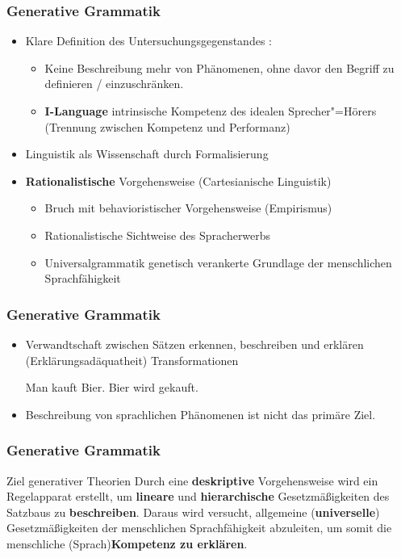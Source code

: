 \begin{frame}
\frametitle{Generative Grammatik}

\begin{itemize}
	\item Klare Definition des Untersuchungsgegenstandes :
	\begin{itemize}
		\item Keine Beschreibung mehr von  Phänomenen, ohne davor den Begriff  zu definieren / einzuschränken.
		\medskip
		\item \textbf{I-Language} \ras intrinsische Kompetenz des idealen Sprecher"=Hörers (Trennung zwischen Kompetenz und Performanz)
	\end{itemize}
	\medskip
	\item Linguistik als Wissenschaft \ras durch Formalisierung
	\medskip
	\item \textbf{Rationalistische} Vorgehensweise (Cartesianische Linguistik)
	\begin{itemize}
		\item Bruch mit behavioristischer Vorgehensweise (Empirismus)
		\item Rationalistische Sichtweise des Spracherwerbs
		\item Universalgrammatik \ras genetisch verankerte Grundlage der menschlichen Sprachfähigkeit
	\end{itemize}
\end{itemize}

\nocite{Fries&MyP16d}

\end{frame}


\begin{frame}
\frametitle{Generative Grammatik}

\begin{itemize}
	\item Verwandtschaft zwischen Sätzen erkennen, beschreiben und erklären (Erklärungsadäquatheit) \ras Transformationen
	
	\eal 
	\ex Man kauft Bier.
	\ex Bier wird gekauft.
	\zl
	
	\medskip	
	\item Beschreibung von sprachlichen Phänomenen ist nicht das primäre Ziel.
\end{itemize}

\end{frame}


\begin{frame}
\frametitle{Generative Grammatik}

\begin{block}{Ziel generativer Theorien}
Durch eine \textbf{deskriptive} Vorgehensweise wird ein Regelapparat erstellt, um \textbf{lineare} und \textbf{hierarchische} Gesetzmäßigkeiten des Satzbaus zu \textbf{beschreiben}. Daraus wird versucht, allgemeine (\textbf{universelle}) Gesetzmäßigkeiten der menschlichen Sprachfähigkeit abzuleiten, um somit die menschliche (Sprach)\textbf{Kompetenz zu erklären}.
\end{block}

\end{frame}


